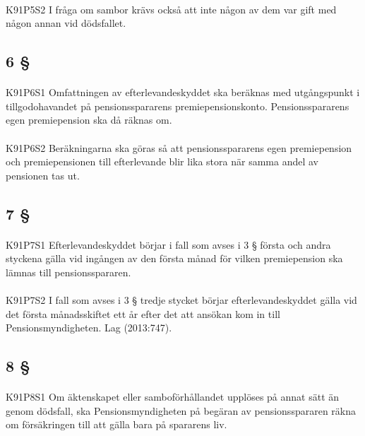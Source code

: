 \documentclass[a4paper,notitlepage,openany,10pt]{book}
\begin{document}
\paragraph*{}
{\tiny K91P5S2}
I fråga om sambor krävs också att inte någon av dem var gift med någon annan vid dödsfallet.
\subsection*{6 §}
\paragraph*{}
{\tiny K91P6S1}
Omfattningen av efterlevandeskyddet ska beräknas med utgångspunkt i tillgodohavandet på pensionsspararens premiepensionskonto. Pensionsspararens egen premiepension ska då räknas om.
\paragraph*{}
{\tiny K91P6S2}
Beräkningarna ska göras så att pensionsspararens egen premiepension och premiepensionen till efterlevande blir lika stora när samma andel av pensionen tas ut.
\subsection*{7 §}
\paragraph*{}
{\tiny K91P7S1}
Efterlevandeskyddet börjar i fall som avses i 3 § första och andra styckena gälla vid ingången av den första månad för vilken premiepension ska lämnas till pensionsspararen.
\paragraph*{}
{\tiny K91P7S2}
I fall som avses i 3 § tredje stycket börjar efterlevandeskyddet gälla vid det första månadsskiftet ett år efter det att ansökan kom in till Pensionsmyndigheten.
Lag (2013:747).
\subsection*{8 §}
\paragraph*{}
{\tiny K91P8S1}
Om äktenskapet eller samboförhållandet upplöses på annat sätt än genom dödsfall, ska Pensionsmyndigheten på begäran av pensionsspararen räkna om försäkringen till att gälla bara på spararens liv.
\end{document}
